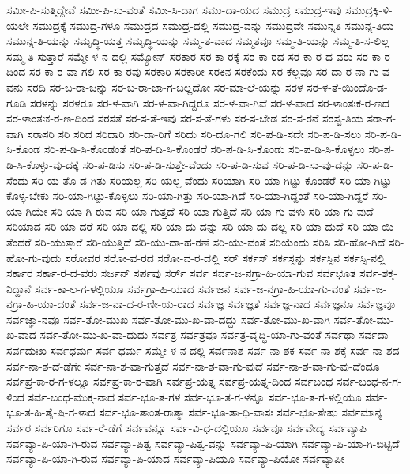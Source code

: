 {ಸಮೀ-ಪಿ-ಸುತ್ತಿದ್ದೇವೆ
ಸಮೀ-ಪಿ-ಸು-ವಂತೆ
ಸಮೀ-ಸಿ-ದಾಗ
ಸಮು-ದಾ-ಯದ
ಸಮುದ್ರ
ಸಮುದ್ರ-ಇವು
ಸಮುದ್ರಕ್ಕಿ-ಳಿ-ಯಲೇ
ಸಮುದ್ರಕ್ಕೆ
ಸಮುದ್ರ-ಗಳೂ
ಸಮುದ್ರದ
ಸಮುದ್ರ-ದಲ್ಲಿ
ಸಮುದ್ರ-ವನ್ನು
ಸಮುದ್ರವೇ
ಸಮುನ್ನತಿ
ಸಮುನ್ನ-ತಿಯ
ಸಮುನ್ನ-ತಿ-ಯನ್ನು
ಸಮೃದ್ಧಿ-ಯತ್ತ
ಸಮೃದ್ಧಿ-ಯನ್ನು
ಸಮ್ಮ-ತ-ವಾದ
ಸಮ್ಮತವೂ
ಸಮ್ಮ-ತಿ-ಯನ್ನು
ಸಮ್ಮ-ತಿ-ಸ-ಲಿಲ್ಲ
ಸಮ್ಮ-ತಿ-ಸುತ್ತಾರೆ
ಸಮ್ಮೇ-ಳ-ನ-ದಲ್ಲಿ
ಸಮ್ಯೋನ್
ಸರಕಾರ
ಸರ-ಕಾ-ರಕ್ಕೆ
ಸರ-ಕಾ-ರದ
ಸರ-ಕಾ-ರ-ದ-ವರು
ಸರ-ಕಾ-ರ-ದಿಂದ
ಸರ-ಕಾ-ರ-ವಾ-ಗಲಿ
ಸರ-ಕಾ-ರವು
ಸರಕಾರಿ
ಸರಕಾರೀ
ಸರಕಿನ
ಸರಕೆಂದು
ಸರ-ಕೆಲ್ಲವೂ
ಸರ-ದಾ-ರ-ನಾ-ಗು-ವ-ವನು
ಸರದಿ
ಸರ-ಬ-ರಾ-ಜನ್ನು
ಸರ-ಬ-ರಾ-ಜಾ-ಗ-ಬಲ್ಲದೋ
ಸರ-ಮಾ-ಲೆ-ಯನ್ನು
ಸರಳ
ಸರ-ಳ-ತೆ-ಯಿಂದೊ-ಡ-ಗೂಡಿ
ಸರಳನ್ನು
ಸರಳರೂ
ಸರ-ಳ-ವಾಗಿ
ಸರ-ಳ-ವಾ-ಗಿದ್ದರೂ
ಸರ-ಳ-ವಾ-ಗಿವೆ
ಸರ-ಳ-ವಾದ
ಸರ-ಳಾಂತಃಕ-ರ-ಣದ
ಸರ-ಳಾಂತಃಕ-ರ-ಣ-ದಿಂದ
ಸರಸತೆ
ಸರ-ಸ-ತೆ-ಇವು
ಸರ-ಸ-ತೆ-ಗಳು
ಸರ-ಸ-ಬೇಡ
ಸರ-ಸ-ರನೆ
ಸರಸ್ವ-ತಿಯ
ಸರಾ-ಗ-ವಾಗಿ
ಸರಾಸರಿ
ಸರಿ
ಸರಿದ
ಸರಿದಾರಿ
ಸರಿ-ದಾ-ರಿಗೆ
ಸರಿದು
ಸರಿ-ದೂ-ಗಲಿ
ಸರಿ-ಪ-ಡಿ-ಸದೇ
ಸರಿ-ಪ-ಡಿ-ಸಲು
ಸರಿ-ಪ-ಡಿ-ಸಿ-ಕೊಂಡ
ಸರಿ-ಪ-ಡಿ-ಸಿ-ಕೊಂಡಂತೆ
ಸರಿ-ಪ-ಡಿ-ಸಿ-ಕೊಂಡರೆ
ಸರಿ-ಪ-ಡಿ-ಸಿ-ಕೊಂಡು
ಸರಿ-ಪ-ಡಿ-ಸಿ-ಕೊಳ್ಳಲು
ಸರಿ-ಪ-ಡಿ-ಸಿ-ಕೊಳ್ಳು-ವು-ದಕ್ಕೆ
ಸರಿ-ಪ-ಡಿಸು
ಸರಿ-ಪ-ಡಿ-ಸುತ್ತೇ-ವೆಂದು
ಸರಿ-ಪ-ಡಿ-ಸುವ
ಸರಿ-ಪ-ಡಿ-ಸು-ವು-ದನ್ನು
ಸರಿ-ಪ-ಡಿ-ಸೆಂದು
ಸರಿ-ಯ-ತೊ-ಡ-ಗಿತು
ಸರಿಯಲ್ಲ
ಸರಿ-ಯಲ್ಲ-ವೆಂದು
ಸರಿಯಾಗಿ
ಸರಿ-ಯಾ-ಗಿಟ್ಟು-ಕೊಂಡರೆ
ಸರಿ-ಯಾ-ಗಿಟ್ಟು-ಕೊಳ್ಳ-ಬೇಕು
ಸರಿ-ಯಾ-ಗಿಟ್ಟು-ಕೊಳ್ಳಲು
ಸರಿ-ಯಾ-ಗಿತ್ತು
ಸರಿ-ಯಾ-ಗಿದೆ
ಸರಿ-ಯಾ-ಗಿದ್ದಂತೆ
ಸರಿ-ಯಾ-ಗಿದ್ದರೆ
ಸರಿ-ಯಾ-ಗಿಯೇ
ಸರಿ-ಯಾ-ಗಿ-ರುವ
ಸರಿ-ಯಾ-ಗುತ್ತದೆ
ಸರಿ-ಯಾ-ಗುತ್ತಿದೆ
ಸರಿ-ಯಾ-ಗು-ವಳು
ಸರಿ-ಯಾ-ಗು-ವುದೆ
ಸರಿಯಾದ
ಸರಿ-ಯಾ-ದರೆ
ಸರಿ-ಯಾ-ದಲ್ಲಿ
ಸರಿ-ಯಾ-ದು-ದನ್ನು
ಸರಿ-ಯಾ-ದು-ದಲ್ಲ
ಸರಿ-ಯಾ-ದುದೆ
ಸರಿ-ಯಾ-ಯಿ-ತೆಂದರೆ
ಸರಿ-ಯುತ್ತಾರೆ
ಸರಿ-ಯುತ್ತಿದೆ
ಸರಿ-ಯು-ದಾ-ಹ-ರಣೆ
ಸರಿ-ಯು-ವಂತೆ
ಸರಿಯೆಂದು
ಸರಿಸಿ
ಸರಿ-ಹೋ-ಗಿದೆ
ಸರಿ-ಹೋ-ಗು-ವುದು
ಸರೋವರ
ಸರೋ-ವ-ರದ
ಸರೋ-ವ-ರ-ದಲ್ಲಿ
ಸರ್
ಸರ್ಕಸ್
ಸರ್ಕಸ್ಸನ್ನು
ಸರ್ಕಸ್ಸಿನ
ಸರ್ಕಸ್ಸಿ-ನಲ್ಲಿ
ಸರ್ಕಾರ
ಸರ್ಕಾ-ರ-ದ-ವರು
ಸರ್ಜನ್
ಸರ್ಪವು
ಸರ್ರ್
ಸರ್ವ
ಸರ್ವ-ಜ-ನಗ್ರಾ-ಹಿ-ಯಾ-ಗುವ
ಸರ್ವಭೂತ
ಸರ್ವ-ಶಕ್ತ-ನಿದ್ದಾನೆ
ಸರ್ವ-ಕಾ-ಲ-ಗ-ಳಲ್ಲಿಯೂ
ಸರ್ವಗ್ರಾ-ಹಿ-ಯಾದ
ಸರ್ವಜನ
ಸರ್ವ-ಜ-ನಗ್ರಾ-ಹಿ-ಯಾ-ಗು-ವಂತೆ
ಸರ್ವ-ಜ-ನಗ್ರಾ-ಹಿ-ಯಾ-ದಂತೆ
ಸರ್ವ-ಜ-ನಾ-ದ-ರ-ಣೀ-ಯ-ರಾದ
ಸರ್ವಜ್ಞ
ಸರ್ವಜ್ಞತೆ
ಸರ್ವಜ್ಞ-ನಾದ
ಸರ್ವಜ್ಞನೂ
ಸರ್ವಜ್ಞವೂ
ಸರ್ವಜ್ಞಾ-ನವೂ
ಸರ್ವ-ತೋ-ಮುಖ
ಸರ್ವ-ತೋ-ಮು-ಖ-ವಾ-ದದ್ದು
ಸರ್ವ-ತೋ-ಮು-ಖ-ವಾಗಿ
ಸರ್ವ-ತೋ-ಮು-ಖ-ವಾದ
ಸರ್ವ-ತೋ-ಮು-ಖ-ವಾ-ದುದು
ಸರ್ವತ್ರ
ಸರ್ವತ್ರವೂ
ಸರ್ವತ್ರ-ವೃದ್ಧಿ-ಯಾ-ಗು-ವಂತೆ
ಸರ್ವಥಾ
ಸರ್ವದಾ
ಸರ್ವದುಃಖ
ಸರ್ವಧರ್ಮ
ಸರ್ವ-ಧರ್ಮ-ಸಮ್ಮೇ-ಳ-ನ-ದಲ್ಲಿ
ಸರ್ವನಾಶ
ಸರ್ವ-ನಾ-ಶಕ
ಸರ್ವ-ನಾ-ಶಕ್ಕೆ
ಸರ್ವ-ನಾ-ಶದ
ಸರ್ವ-ನಾ-ಶ-ದೆ-ಡೆಗೇ
ಸರ್ವ-ನಾ-ಶ-ವಾ-ಗುತ್ತದೆ
ಸರ್ವ-ನಾ-ಶ-ವಾ-ಗು-ವುದೆ
ಸರ್ವ-ನಾ-ಶ-ವಾ-ಗು-ವು-ದೆಂದೂ
ಸರ್ವಪ್ರ-ಕಾ-ರ-ಗ-ಳಲ್ಲೂ
ಸರ್ವಪ್ರ-ಕಾ-ರ-ವಾಗಿ
ಸರ್ವಪ್ರ-ಯತ್ನ
ಸರ್ವಪ್ರ-ಯತ್ನ-ದಿಂದ
ಸರ್ವಬಂಧ
ಸರ್ವ-ಬಂಧ-ನ-ಗ-ಳಿಂದ
ಸರ್ವ-ಬಂಧ-ಮುಕ್ತ-ನಾದ
ಸರ್ವ-ಭೂ-ತ-ಗಳ
ಸರ್ವ-ಭೂ-ತ-ಗ-ಳನ್ನೂ
ಸರ್ವ-ಭೂ-ತ-ಗ-ಳಲ್ಲಿಯೂ
ಸರ್ವ-ಭೂ-ತ-ಹಿ-ತೈ-ಷಿ-ಗ-ಳಾದ
ಸರ್ವ-ಭೂ-ತಾಂತ-ರಾತ್ಮಾ
ಸರ್ವ-ಭೂ-ತಾ-ಧಿ-ವಾಸಃ
ಸರ್ವ-ಭೂ-ತೇಷು
ಸರ್ವಮಾನ್ಯ
ಸರ್ವರ
ಸರ್ವರಿಗೂ
ಸರ್ವ-ರೆ-ಡೆಗೆ
ಸರ್ವವನ್ನೂ
ಸರ್ವ-ವಿ-ಧ-ದಲ್ಲಿಯೂ
ಸರ್ವವೂ
ಸರ್ವವೇದ್ಯ
ಸರ್ವವ್ಯಾಪಿ
ಸರ್ವವ್ಯಾ-ಪಿ-ಯಾ-ಗಿ-ರುವ
ಸರ್ವವ್ಯಾ-ಪಿತ್ವ
ಸರ್ವವ್ಯಾ-ಪಿತ್ವ-ವನ್ನು
ಸರ್ವವ್ಯಾ-ಪಿ-ಯಾಗಿ
ಸರ್ವವ್ಯಾ-ಪಿ-ಯಾ-ಗಿ-ಬಿಟ್ಟಿದೆ
ಸರ್ವವ್ಯಾ-ಪಿ-ಯಾ-ಗಿ-ರುವ
ಸರ್ವವ್ಯಾ-ಪಿ-ಯಾದ
ಸರ್ವವ್ಯಾ-ಪಿಯೂ
ಸರ್ವವ್ಯಾ-ಪಿಯೋ
ಸರ್ವವ್ಯಾಪೀ
}
